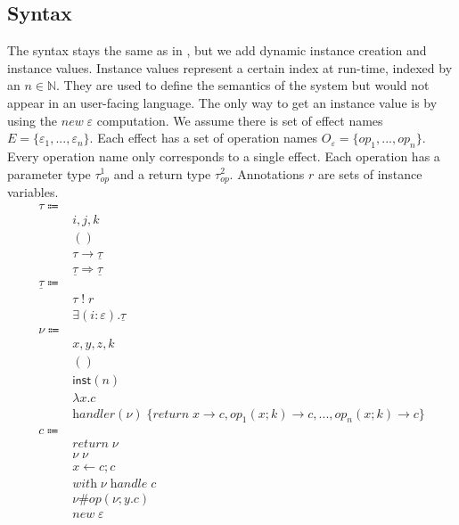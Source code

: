 \documentclass[12pt]{article}
\newcommand\Eff[0]{E}
\newcommand\eff[0]{\varepsilon}
\newcommand\Op[0]{O}
\newcommand\op[0]{op}
\newcommand\pty[1]{\ty^1_{#1}}
\newcommand\rty[1]{\ty^2_{#1}}
\newcommand\ty[0]{\tau}
\newcommand\tunit[0]{()}
\newcommand\tarr[2]{#1 \rightarrow #2}
\newcommand\thandler[2]{#1 \Rightarrow #2}
\newcommand\cty[0]{\underline{\ty}}
\newcommand\aty[2]{#1 \; ! \; #2}
\newcommand\texists[3]{\exists(#1:#2) . #3}
\newcommand\val[0]{\nu}
\newcommand\vunit[0]{()}
\newcommand\vinst[1]{\mathsf{inst}(#1)}
\newcommand\vabs[2]{\lambda #1 . #2}
\newcommand\vhandleri[2]{\textit{handler} ( #1 ) \; \{#2\}}
\newcommand\vhandlerci[1]{\vhandleri{#1}{
	\textit{return} \; x \rightarrow \comp,
	\op_1(x ; k) \rightarrow \comp,
	...,
	\op_n(x ; k) \rightarrow \comp
}}
\newcommand\comp[0]{c}
\newcommand\creturn[1]{\textit{return} \; #1}
\newcommand\capp[2]{#1 \; #2}
\newcommand\cdo[3]{#1 \leftarrow #2 ; #3}
\newcommand\copi[5]{#1 \# #2(#3 ; #4 . #5)}
\newcommand\chandle[2]{\textit{with} \; #1 \; \textit{handle} \; #2}
\newcommand\cnew[1]{\textit{new} \; #1}
\begin{document}
\subsection{Syntax}
The syntax stays the same as in \cite{effectsystem}, but we add dynamic instance creation and instance values.
Instance values represent a certain index at run-time, indexed by an $n \in \mathbb{N}$.
They are used to define the semantics of the system but would not appear in an user-facing language.
The only way to get an instance value is by using the $\cnew{\eff}$ computation.  
We assume there is set of effect names $\Eff = \{ \eff_1, ..., \eff_n \}$.
Each effect has a set of operation names $\Op_\eff = \{ \op_1, ..., \op_n \}$.
Every operation name only corresponds to a single effect.
Each operation has a parameter type $\pty{\op}$ and a return type $\rty{\op}$.
Annotations $r$ are sets of instance variables. 
\\
\begin{align*}
	\ty \Coloneqq 				& 											\tag{value types} \\
									& i, j, k									\tag{instance variables} \\
									& \tunit									\tag{unit type} \\
									& \tarr{\ty}{\cty}						\tag{type of functions} \\
									& \thandler{\cty}{\cty}				\tag{type of handlers} \\
	\cty \Coloneqq 			& 											\tag{computation types} \\
									& \aty{\ty}{r}							\tag{annotated type} \\
									& \texists{i}{\eff}{\cty}				\tag{existential} \\
	\val \Coloneqq			&											\tag{values} \\
									& x, y, z, k								\tag{variables} \\
									& \vunit									\tag{unit value} \\
									& \vinst{n}								\tag{instance values} \\
									& \vabs{x}{\comp}					\tag{abstraction} \\
									& \vhandlerci{\val}						\tag{handler} \\
	\comp \Coloneqq		&											\tag{computations} \\
									& \creturn{\val}						\tag{return value as computation} \\
									& \capp{\val}{\val}					\tag{application} \\
									& \cdo{x}{\comp}{\comp}			\tag{sequencing} \\
									& \chandle{\val}{\comp}			\tag{handler application} \\
									& \copi{\val}{\op}{\val}{y}{\comp}	\tag{operation call} \\
									& \cnew{\eff}							\tag{instance creation} \\
\end{align*}
\end{document}
